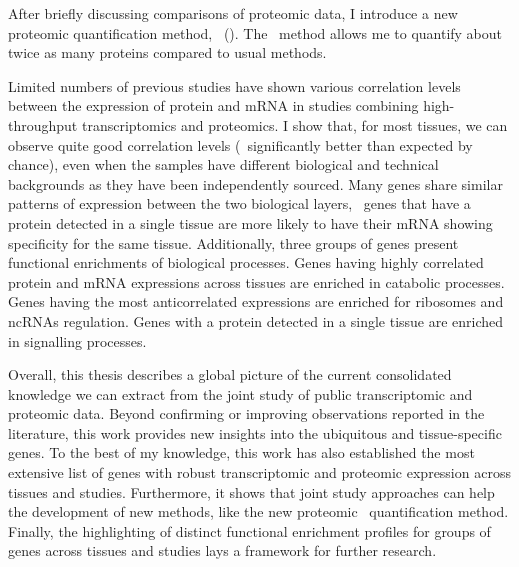 \begin{singlespace}
{    \vspace{-1mm}
    After briefly discussing comparisons of proteomic data,
    I introduce a new proteomic quantification method,
    \PPKM\ ().
    The \PPKM\ method allows me to quantify about twice as many proteins
    compared to usual methods.\mybr\

    \vspace{-1mm}
    Limited numbers of previous studies have shown various correlation levels
    between the expression of protein and mRNA
    in studies combining high-throughput transcriptomics and proteomics.
    I show that, for most tissues,
    we can observe quite good correlation levels
    (\ie\ significantly better than expected by chance),
    even when the samples have different biological and technical backgrounds
    as they have been independently sourced.
    Many genes share similar patterns of expression
    between the two biological layers,
    \eg\ genes that have a protein detected in a single tissue
    are more likely to have their mRNA showing specificity for the same tissue.
    Additionally, three groups of genes present functional enrichments
    of biological processes.
    Genes having highly correlated protein and mRNA expressions across tissues
    are enriched in catabolic processes.
    Genes having the most anticorrelated expressions are enriched
    for ribosomes and ncRNAs regulation.
    Genes with a protein detected in a single tissue are enriched
    in signalling processes.\mybr\

    \vspace{-1mm}
    Overall, this thesis describes a global picture
    of the current consolidated knowledge
    we can extract from the joint study
    of public transcriptomic and proteomic data.
    Beyond confirming or improving observations reported in the literature,
    this work provides new insights
    into the ubiquitous and tissue-specific genes.
    To the best of my knowledge,
    this work has also established the most extensive list of genes
    with robust transcriptomic and proteomic expression across tissues and studies.
    Furthermore, it shows that joint study approaches can help the development
    of new methods, like the new proteomic \PPKM\ quantification method.
    Finally, the highlighting of distinct functional enrichment profiles
    for groups of genes across tissues and studies
    lays a framework for further research.\mybr\
    }
\end{singlespace}
